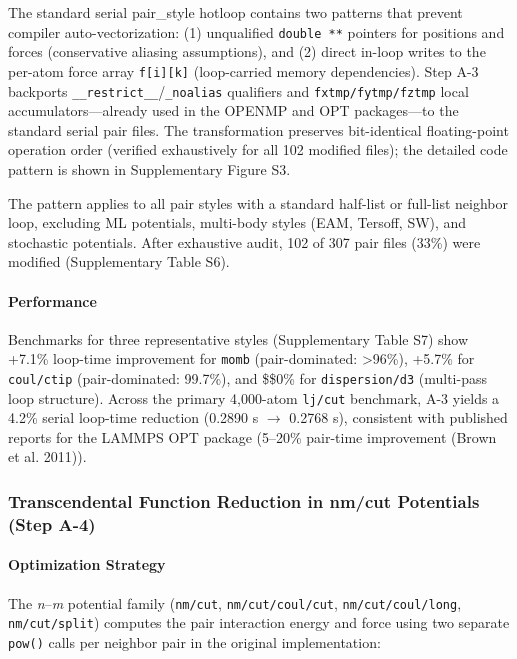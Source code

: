 \documentclass[
  11pt,
]{article}
\begin{document}
The standard serial pair\_style hotloop contains two patterns that
prevent compiler auto-vectorization: (1) unqualified \texttt{double\ **}
pointers for positions and forces (conservative aliasing assumptions),
and (2) direct in-loop writes to the per-atom force array
\texttt{f{[}i{]}{[}k{]}} (loop-carried memory dependencies). Step A-3
backports \texttt{\_\_restrict\_\_}/\texttt{\_noalias} qualifiers and
\texttt{fxtmp/fytmp/fztmp} local accumulators---already used in the
OPENMP and OPT packages---to the standard serial pair files. The
transformation preserves bit-identical floating-point operation order
(verified exhaustively for all 102 modified files); the detailed code
pattern is shown in Supplementary Figure S3.

The pattern applies to all pair styles with a standard half-list or
full-list neighbor loop, excluding ML potentials, multi-body styles
(EAM, Tersoff, SW), and stochastic potentials. After exhaustive audit,
102 of 307 pair files (33\%) were modified (Supplementary Table S6).

\paragraph{Performance}\label{performance}

Benchmarks for three representative styles (Supplementary Table S7) show
+7.1\% loop-time improvement for \texttt{momb} (pair-dominated:
\textgreater96\%), +5.7\% for \texttt{coul/ctip} (pair-dominated:
99.7\%), and \$\approx\$0\% for \texttt{dispersion/d3} (multi-pass loop
structure). Across the primary 4,000-atom \texttt{lj/cut} benchmark, A-3
yields a 4.2\% serial loop-time reduction (0.2890 s \(\rightarrow\)
0.2768 s), consistent with published reports for the LAMMPS OPT package
(5--20\% pair-time improvement (Brown et al. 2011)).

\subsubsection{Transcendental Function Reduction in nm/cut Potentials
(Step
A-4)}\label{transcendental-function-reduction-in-nmcut-potentials-step-a-4}

\paragraph{Optimization Strategy}\label{optimization-strategy}

The \emph{n}--\emph{m} potential family (\texttt{nm/cut},
\texttt{nm/cut/coul/cut}, \texttt{nm/cut/coul/long},
\texttt{nm/cut/split}) computes the pair interaction energy and force
using two separate \texttt{pow()} calls per neighbor pair in the
original implementation:
\end{document}
